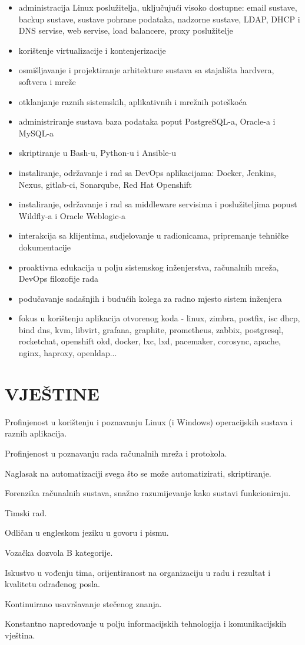 \documentclass{cv}
\begin{document}
\begin{itemize}
    \setlength\itemsep{0.1cm}
    \item administracija Linux poslužitelja, uključujući visoko dostupne: email sustave, backup sustave, sustave pohrane podataka, nadzorne sustave, LDAP, DHCP i DNS servise, web servise, load balancere, proxy poslužitelje
    \item korištenje virtualizacije i kontenjerizacije
    \item osmišljavanje i projektiranje arhitekture sustava sa stajališta hardvera, softvera i mreže
    \item otklanjanje raznih sistemskih, aplikativnih i mrežnih poteškoća
    \item administriranje sustava baza podataka poput PostgreSQL-a, Oracle-a i MySQL-a
    \item skriptiranje u Bash-u, Python-u i Ansible-u 
    \item instaliranje, održavanje i rad sa DevOps aplikacijama: Docker, Jenkins, Nexus, gitlab-ci, Sonarqube, Red Hat Openshift
    \item instaliranje, održavanje i rad sa middleware servisima i poslužiteljima popust Wildfly-a i Oracle Weblogic-a
    \item interakcija sa klijentima, sudjelovanje u radionicama, pripremanje tehničke dokumentacije
    \item proaktivna edukacija u polju sistemskog inženjerstva, računalnih mreža, DevOps filozofije rada
    \item podučavanje sadašnjih i budućih kolega za radno mjesto sistem inženjera
    \item fokus u korištenju aplikacija otvorenog koda - linux, zimbra, postfix, isc dhcp, bind dns, kvm, libvirt, grafana, graphite, prometheus, zabbix, postgresql, rocketchat, openshift okd, docker, lxc, lxd, pacemaker, corosync, apache, nginx, haproxy, openldap...
\end{itemize}
\section{VJEŠTINE}
Profinjenost u korištenju i poznavanju Linux (i Windows) operacijskih sustava i raznih aplikacija.

Profinjenost u poznavanju rada računalnih mreža i protokola.

Naglasak na automatizaciji svega što se može automatizirati, skriptiranje.

Forenzika računalnih sustava, snažno razumijevanje kako sustavi funkcioniraju.

Timski rad.

Odličan u engleskom jeziku u govoru i pismu.

Vozačka dozvola B kategorije.

Iskustvo u vođenju tima, orijentiranost na organizaciju u radu i rezultat i kvalitetu odrađenog posla.

Kontinuirano usavršavanje stečenog znanja.

Konstantno napredovanje u polju informacijskih tehnologija i komunikacijskih vještina.
\end{document}
